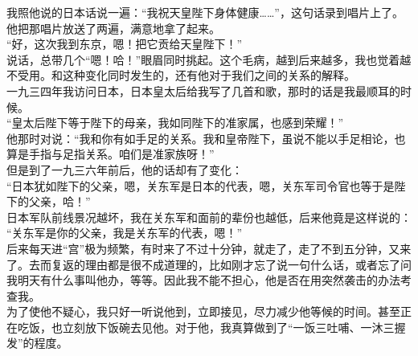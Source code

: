 我照他说的日本话说一遍：“我祝天皇陛下身体健康……”，这句话录到唱片上了。他把那唱片放送了两遍，满意地拿了起来。\\

“好，这次我到东京，嗯！把它贡给天皇陛下！”\\

说话，总带几个“嗯！哈！”眼眉同时挑起。这个毛病，越到后来越多，我也觉着越不受用。和这种变化同时发生的，还有他对于我们之间的关系的解释。\\

一九三四年我访问日本，日本皇太后给我写了几首和歌，那时的话是我最顺耳的时候。\\

“皇太后陛下等于陛下的母亲，我如同陛下的准家属，也感到荣耀！”\\

他那时对说：“我和你有如手足的关系。我和皇帝陛下，虽说不能以手足相论，也算是手指与足指关系。咱们是准家族呀！”\\

但是到了一九三六年前后，他的话却有了变化：\\

“日本犹如陛下的父亲，嗯，关东军是日本的代表，嗯，关东军司令官也等于是陛下的父亲，哈！”\\

日本军队前线景况越坏，我在关东军和面前的辈份也越低，后来他竟是这样说的：\\

“关东军是你的父亲，我是关东军的代表，嗯！”\\

后来每天进“宫”极为频繁，有时来了不过十分钟，就走了，走了不到五分钟，又来了。去而复返的理由都是很不成道理的，比如刚才忘了说一句什么话，或者忘了问我明天有什么事叫他办，等等。因此我不能不担心，他是否在用突然袭击的办法考查我。\\

为了使他不疑心，我只好一听说他到，立即接见，尽力减少他等候的时间。甚至正在吃饭，也立刻放下饭碗去见他。对于他，我真算做到了“一饭三吐哺、一沐三握发”的程度。
